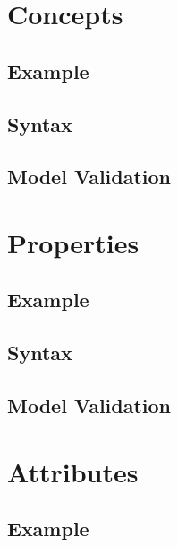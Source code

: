 \documentclass[a4paper,oneside,12pt, extrafontsizes]{memoir}
\begin{document}
  \chapter{Concepts}
  \label{ch:concepts}
  

    \section{Example}
    

    \section{Syntax}
    

    \section{Model Validation}
    

  \chapter{Properties}
  \label{ch:properties}
  

    \section{Example}
    

    \section{Syntax}
    

    \section{Model Validation}
    

  \chapter{Attributes}
  \label{ch:attributes}
  

    \section{Example}
    
\end{document}

